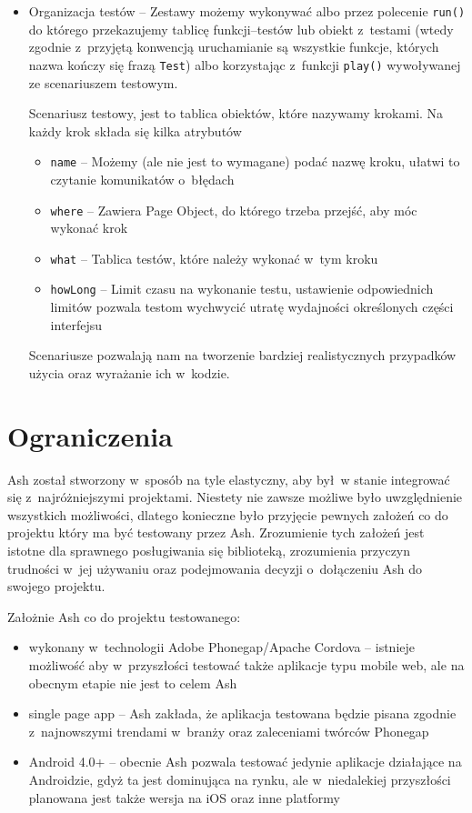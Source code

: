 \documentclass[brudnopis]{xmgr}
\begin{document}
\begin{itemize}
 \item Organizacja testów -- Zestawy możemy wykonywać albo przez polecenie \texttt{run()} do którego przekazujemy tablicę funkcji--testów lub obiekt z~testami (wtedy zgodnie z~przyjętą konwencją uruchamianie są wszystkie funkcje, których nazwa kończy się frazą \texttt{Test}) albo korzystając z~funkcji \texttt{play()} wywoływanej ze scenariuszem testowym.

Scenariusz testowy, jest to tablica obiektów, które nazywamy krokami. Na każdy krok składa się kilka atrybutów

  \begin{itemize}
    \item \texttt{name} -- Możemy (ale nie jest to wymagane) podać nazwę kroku, ułatwi to czytanie komunikatów o~błędach
    \item \texttt{where} -- Zawiera Page Object, do którego trzeba przejść, aby móc wykonać krok 
    \item \texttt{what} -- Tablica testów, które należy wykonać w~tym kroku
    \item \texttt{howLong} -- Limit czasu na wykonanie testu, ustawienie odpowiednich limitów pozwala testom wychwycić utratę wydajności określonych części interfejsu
  \end{itemize}

Scenariusze pozwalają nam na tworzenie bardziej realistycznych przypadków użycia oraz wyrażanie ich w~kodzie. 

\end{itemize}

\section{Ograniczenia}

Ash został stworzony w~sposób na tyle elastyczny, aby był~w stanie integrować się z~najróżniejszymi projektami. Niestety nie zawsze możliwe było uwzględnienie wszystkich możliwości, dlatego konieczne było przyjęcie pewnych założeń co do projektu który ma być testowany przez Ash. Zrozumienie tych założeń jest istotne dla sprawnego posługiwania się biblioteką, zrozumienia przyczyn trudności w~jej używaniu oraz podejmowania decyzji o~dołączeniu Ash do swojego projektu.

Założnie Ash co do projektu testowanego:

\begin{itemize}
  \item wykonany w~technologii Adobe Phonegap/Apache Cordova -- istnieje możliwość aby w~przyszłości testować także aplikacje typu mobile web, ale na obecnym etapie nie jest to celem Ash
  \item single page app -- Ash zakłada, że aplikacja testowana będzie pisana zgodnie z~najnowszymi trendami w~branży oraz zaleceniami twórców Phonegap
  \item Android 4.0+ -- obecnie Ash pozwala testować jedynie aplikacje działające na Androidzie, gdyż ta jest dominująca na rynku, ale w~niedalekiej przyszłości planowana jest także wersja na iOS oraz inne platformy
\end{itemize}
\end{document}
